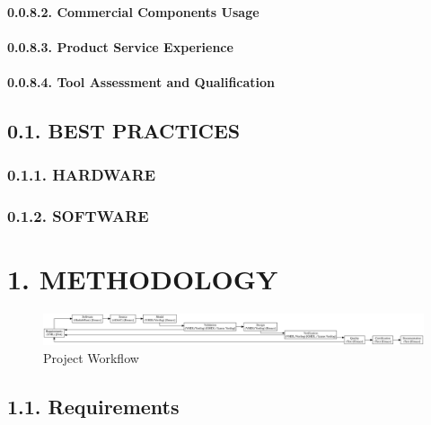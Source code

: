 \documentclass[
]{article}
\begin{document}
\hypertarget{commercial-components-usage}{%
\paragraph{0.0.8.2. Commercial Components
Usage}\label{commercial-components-usage}}

\hypertarget{product-service-experience}{%
\paragraph{0.0.8.3. Product Service
Experience}\label{product-service-experience}}

\hypertarget{tool-assessment-and-qualification}{%
\paragraph{0.0.8.4. Tool Assessment and
Qualification}\label{tool-assessment-and-qualification}}

\hypertarget{best-practices}{%
\subsection{0.1. BEST PRACTICES}\label{best-practices}}

\hypertarget{hardware}{%
\subsubsection{0.1.1. HARDWARE}\label{hardware}}

\hypertarget{software}{%
\subsubsection{0.1.2. SOFTWARE}\label{software}}

\hypertarget{methodology}{%
\section{1. METHODOLOGY}\label{methodology}}

\begin{figure}
\centering
\includegraphics{../doc/project.svg}
\caption{Project Workflow}
\end{figure}

\hypertarget{requirements}{%
\subsection{1.1. Requirements}\label{requirements}}
\end{document}
